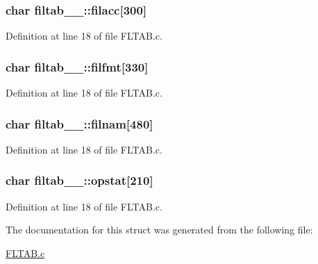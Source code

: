 \subsubsection[{\texorpdfstring{filacc}{filacc}}]{\setlength{\rightskip}{0pt plus 5cm}char filtab\+\_\+\_\+\+::filacc\mbox{[}300\mbox{]}}\hypertarget{structfiltab__1___ae87377bdff4e91b875e19b14da21acf7}{}\label{structfiltab__1___ae87377bdff4e91b875e19b14da21acf7}


Definition at line 18 of file F\+L\+T\+A\+B.\+c.

\subsubsection[{\texorpdfstring{filfmt}{filfmt}}]{\setlength{\rightskip}{0pt plus 5cm}char filtab\+\_\+\_\+\+::filfmt\mbox{[}330\mbox{]}}\hypertarget{structfiltab__1___a7b22fc236359553ca430377448498c67}{}\label{structfiltab__1___a7b22fc236359553ca430377448498c67}


Definition at line 18 of file F\+L\+T\+A\+B.\+c.

\subsubsection[{\texorpdfstring{filnam}{filnam}}]{\setlength{\rightskip}{0pt plus 5cm}char filtab\+\_\+\_\+\+::filnam\mbox{[}480\mbox{]}}\hypertarget{structfiltab__1___a1528d290e835f881a9cd027daeb59be1}{}\label{structfiltab__1___a1528d290e835f881a9cd027daeb59be1}


Definition at line 18 of file F\+L\+T\+A\+B.\+c.

\subsubsection[{\texorpdfstring{opstat}{opstat}}]{\setlength{\rightskip}{0pt plus 5cm}char filtab\+\_\+\_\+\+::opstat\mbox{[}210\mbox{]}}\hypertarget{structfiltab__1___a1ad8a608f1d97169238d280ca846de62}{}\label{structfiltab__1___a1ad8a608f1d97169238d280ca846de62}


Definition at line 18 of file F\+L\+T\+A\+B.\+c.



The documentation for this struct was generated from the following file\+:\begin{DoxyCompactItemize}
\item 
\hyperlink{FLTAB_8c}{F\+L\+T\+A\+B.\+c}\end{DoxyCompactItemize}
